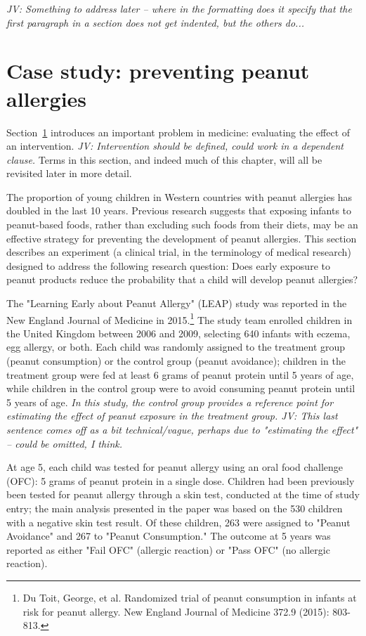 \begin{doublespace}
\textit{JV: Something to address later -- where in the formatting does it specify that the first paragraph in a section does not get indented, but the others do...}

\section[Case study]{Case study: preventing peanut allergies}
\label{leapCaseStudy}


Section~\ref{leapCaseStudy} introduces an important problem in medicine: evaluating the effect of an intervention. \textit{JV: Intervention should be defined, could work in a dependent clause.} Terms in this section, and indeed much of this chapter, will all be revisited later in more detail.

The proportion of young children in Western countries with peanut allergies has doubled in the last 10 years. Previous research suggests that exposing infants to peanut-based foods, rather than excluding such foods from their diets, may be an effective strategy for preventing the development of peanut allergies. This section describes an experiment (a clinical trial, in the terminology of medical research) designed to address the following research question: Does early exposure to peanut products reduce the probability that a child will develop peanut allergies? 

The "Learning Early about Peanut Allergy" (LEAP) study was reported in the New England Journal of Medicine in 2015.\footnote{Du Toit, George, et al. Randomized trial of peanut consumption in infants at risk for peanut allergy. New England Journal of Medicine 372.9 (2015): 803-813.} The study team enrolled children in the United Kingdom between 2006 and 2009, selecting 640 infants with eczema, egg allergy, or both. Each child was randomly assigned to the treatment group (peanut consumption) or the control group (peanut avoidance); children in the treatment group were fed at least 6 grams of peanut protein until 5 years of age, while children in the control group were to avoid consuming peanut protein until 5 years of age. \textit{In this study, the control group provides a reference point for estimating the effect of peanut exposure in the treatment group. JV: This last sentence comes off as a bit technical/vague, perhaps due to "estimating the effect" -- could be omitted, I think.}

At age 5, each child was tested for peanut allergy using an oral food challenge (OFC): 5 grams of peanut protein in a single dose. Children had been previously been tested for peanut allergy through a skin test, conducted at the time of study entry; the main analysis presented in the paper was based on the 530 children with a negative skin test result. Of these children, 263 were assigned to "Peanut Avoidance" and 267 to "Peanut Consumption." The outcome at 5 years was reported as either "Fail OFC" (allergic reaction) or "Pass OFC" (no allergic reaction). 


\end{doublespace}
